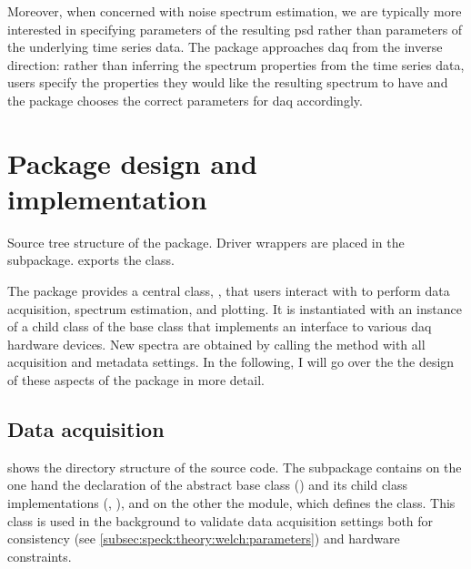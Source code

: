 Moreover, when concerned with noise spectrum estimation, we are typically more interested in specifying parameters of the resulting \gls{psd} rather than parameters of the underlying time series data.
The \pyspeck package approaches \acrlong{daq} from the inverse direction: rather than inferring the spectrum properties from the time series data, users specify the properties they would like the resulting spectrum to have and the package chooses the correct parameters for \acrlong{daq} accordingly.

\section{Package design and implementation}\label{sec:speck:software:design}
\begin{marginfigure}[-3.75cm]
    
    \caption[Source tree structure of the \pyspeck package.]{
        Source tree structure of the \pyspeck package.
        Driver wrappers are placed in the  subpackage.
         exports the  class.
    }
    \label{fig:speck:software:tree}
\end{marginfigure}
The \pyspeck package provides a central class, , that users interact with to perform data acquisition, spectrum estimation, and plotting.
It is instantiated with an instance of a child class of the  base class that implements an interface to various \gls{daq} hardware devices.
New spectra are obtained by calling the  method with all acquisition and metadata settings.
In the following, I will go over the the design of these aspects of the package in more detail.

\subsection{Data acquisition}\label{subsec:speck:software:design:daq}
 shows the directory structure of the source code.
The  subpackage contains on the one hand the declaration of the  abstract base class () and its child class implementations (, \etc), and on the other the  module, which defines the  class.
This class is used in the background to validate data acquisition settings both for consistency (see \cref{subsec:speck:theory:welch:parameters}) and hardware constraints.

